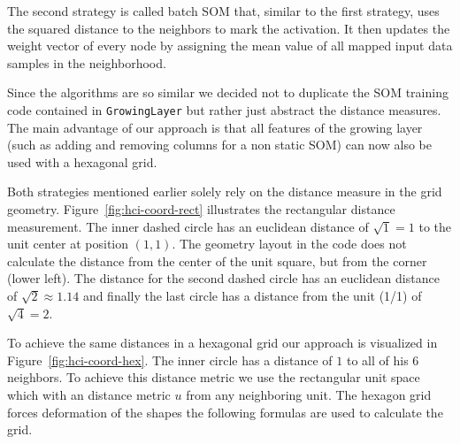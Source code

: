\documentclass{acm_proc_article-sp}
\begin{document}
The second strategy is called batch SOM that, similar to the first strategy, uses the squared distance to the neighbors
to mark the activation. It then updates the weight vector of every node by assigning the mean value of all mapped input
data samples in the neighborhood.

Since the algorithms are so similar we decided not to duplicate the SOM training code contained in \lstinline!GrowingLayer! but
rather just abstract the distance measures. The main advantage of our approach is that all features of the growing layer (such as adding and removing columns for a non static SOM) can now also be used with a hexagonal grid.

Both strategies mentioned earlier solely rely on the distance measure in the grid geometry.
Figure~\ref{fig:hci-coord-rect} illustrates the rectangular distance measurement.
The inner dashed circle has an euclidean distance of $\sqrt{1} = 1$ to
the unit center at position $(1,1)$. The geometry layout in the code does not calculate the distance from the center of
the unit square, but from the corner (lower left). The distance for the second dashed circle has an euclidean distance of $\sqrt{2} \approx 1.14$ and finally the last circle has a distance from the unit (1/1) of $\sqrt{4} = 2$.

To achieve the same distances in a hexagonal grid our approach is visualized in Figure~\ref{fig:hci-coord-hex}.
The inner circle has a distance of $1$ to all of his 6 neighbors. To achieve this distance metric
we use the rectangular unit space which with an distance metric $u$ from any neighboring unit. The hexagon grid forces deformation
of the shapes the following formulas are used to calculate the grid.
\end{document}

